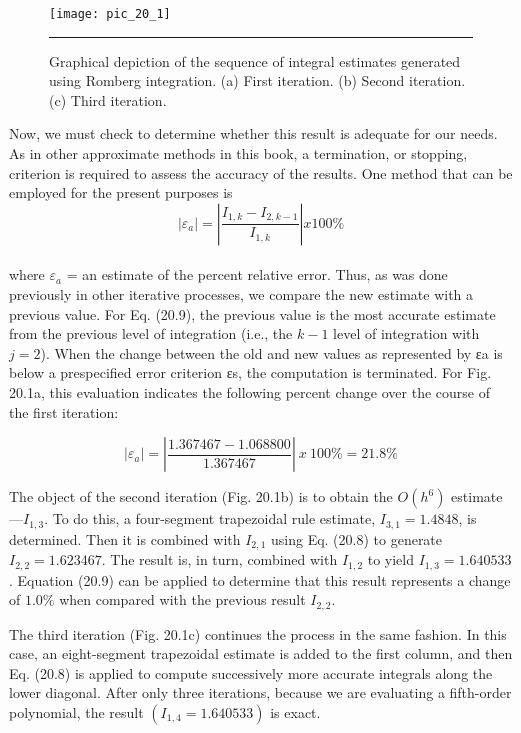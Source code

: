 \documentclass[../main.tex]{subfiles}
\begin{document}
\begin{figure}[hbt!]
	\centering
	\texttt{[image: pic\_20\_1]}
	\caption{\textsf{Graphical depiction of the sequence of integral estimates generated using Romberg integration.
(a) First iteration. (b) Second iteration. (c) Third iteration.}} \hrule
	\label{pic.20.1}
\end{figure}
\vspace{0.3in}

Now, we must check to determine whether this result is adequate for our needs. As in
other approximate methods in this book, a termination, or stopping, criterion is required to
assess the accuracy of the results. One method that can be employed for the present purposes is
\begin{equation}
	\tag{20.9}
	|\varepsilon_a|=\left|\dfrac{I_{1,k}-I_{2,k-1}}{I_{1,k}} \right| x100\%
\end{equation}\\
where $\varepsilon_a$ = an estimate of the percent relative error. Thus, as was done previously in other
iterative processes, we compare the new estimate with a previous value. For Eq. (20.9), the
previous value is the most accurate estimate from the previous level of integration (i.e., the
$k − 1$ level of integration with $j = 2$). When the change between the old and new values
as represented by εa is below a prespecified error criterion εs, the computation is terminated. For Fig. 20.1a, this evaluation indicates the following percent change over the
course of the first iteration:

	$$|\varepsilon_a|= \left|\dfrac{1.367467 − 1.068800}{1.367467} \right| \: x \: 100\% = 21.8\%$$
	
The object of the second iteration (Fig. 20.1b) is to obtain the $O(h^6)$ estimate—$I_{1,3}$.
To do this, a four-segment trapezoidal rule estimate, $I_{3,1} = 1.4848$, is determined. Then it
is combined with $I_{2,1}$ using Eq. (20.8) to generate $I_{2,2} = 1.623467$. The result is, in turn,
combined with $I_{1,2}$ to yield $I_{1,3} = 1.640533$. Equation (20.9) can be applied to determine
that this result represents a change of $1.0\%$ when compared with the previous result $I_{2,2}$.

The third iteration (Fig. 20.1c) continues the process in the same fashion. In this case,
an eight-segment trapezoidal estimate is added to the first column, and then Eq. (20.8) is
applied to compute successively more accurate integrals along the lower diagonal. After
only three iterations, because we are evaluating a fifth-order polynomial, the result
$(I_{1,4} = 1.640533)$ is exact.
\end{document}
